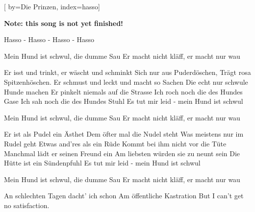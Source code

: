 

[%
    by={Die Prinzen},
    index={hasso}]


    \label{hasso}

    \textbf{Note: this song is not yet finished!}

    \beginverse*
        Hasso - Hasso - Hasso - Hasso
    \endverse

    \beginchorus\memorize[chorus]
        Mein Hund ist schwul, die dumme Sau
        Er macht nicht kläff, er macht nur wau
    \endchorus

    \beginverse\memorize[verse]
        Er isst und trinkt, er wäscht und schminkt
        Sich nur aus Puderdöschen,
        Trägt rosa Spitzenhöschen.
        Er schmust und leckt und macht so Sachen
        Die echt nur schwule Hunde machen
        Er pinkelt niemals auf die Strasse
        Ich roch noch die des Hundes Gase
        Ich sah noch die des Hundes Stuhl
        Es tut mir leid - mein Hund ist schwul
    \endverse

    \beginchorus\replay[chorus]
        Mein Hund ist schwul, die dumme Sau
        Er macht nicht kläff, er macht nur wau
    \endchorus

    \beginverse\replay[verse]
        Er ist als Pudel ein Ästhet
        Dem öfter mal die Nudel steht
        Was meistens nur im Rudel geht
        Etwas and'res als ein Rüde
        Kommt bei ihm nicht vor die Tüte
        Manchmal lädt er seinen Freund ein
        Am liebsten würden sie zu neunt sein
        Die Hütte ist ein Sündenpfuhl
        Es tut mir leid - mein Hund ist schwul
    \endverse

    \beginchorus\replay[chorus]
        Mein Hund ist schwul, die dumme Sau
        Er macht nicht kläff, er macht nur wau
    \endchorus

    \beginverse\replay[verse]
        An schlechten Tagen dacht' ich schon
        Am öffentliche Kastration
        But I can't get no satisfaction.
    \endverse
\endsong
